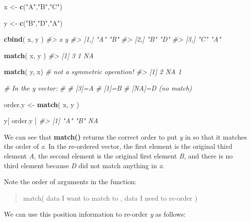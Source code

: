 \documentclass[]{book}
\newenvironment{Shaded}{\begin{snugshade}}{\end{snugshade}}
\newcommand{\CommentTok}[1]{\textcolor[rgb]{0.56,0.35,0.01}{\textit{#1}}}
\newcommand{\KeywordTok}[1]{\textcolor[rgb]{0.13,0.29,0.53}{\textbf{#1}}}
\newcommand{\NormalTok}[1]{#1}
\newcommand{\StringTok}[1]{\textcolor[rgb]{0.31,0.60,0.02}{#1}}
\theoremstyle{definition}
\theoremstyle{definition}
\theoremstyle{definition}
\theoremstyle{remark}
\begin{document}
\begin{Shaded}
\begin{Highlighting}[]

\NormalTok{x <-}\StringTok{ }\KeywordTok{c}\NormalTok{(}\StringTok{"A"}\NormalTok{,}\StringTok{"B"}\NormalTok{,}\StringTok{"C"}\NormalTok{)}

\NormalTok{y <-}\StringTok{ }\KeywordTok{c}\NormalTok{(}\StringTok{"B"}\NormalTok{,}\StringTok{"D"}\NormalTok{,}\StringTok{"A"}\NormalTok{)}

\KeywordTok{cbind}\NormalTok{( x, y )}
\CommentTok{#>      x   y  }
\CommentTok{#> [1,] "A" "B"}
\CommentTok{#> [2,] "B" "D"}
\CommentTok{#> [3,] "C" "A"}

\KeywordTok{match}\NormalTok{( x, y )}
\CommentTok{#> [1]  3  1 NA}

\KeywordTok{match}\NormalTok{( y, x) }\CommentTok{# not a symmetric operation!}
\CommentTok{#> [1]  2 NA  1}

\CommentTok{# In the y vector:}
\CommentTok{#}
\CommentTok{#  [3]=A}
\CommentTok{#  [1]=B}
\CommentTok{# [NA]=D (no match)}

\NormalTok{order.y <-}\StringTok{ }\KeywordTok{match}\NormalTok{( x, y )}

\NormalTok{y[ order.y ]}
\CommentTok{#> [1] "A" "B" NA}
\end{Highlighting}
\end{Shaded}

We can see that \textbf{match()} returns the correct order to put
\emph{y} in so that it matches the order of \emph{x}. In the re-ordered
vector, the first element is the original third element \emph{A}, the
second element is the original first element \emph{B}, and there is no
third element because \emph{D} did not match anything in \emph{x}.

Note the order of arguments in the function:

\begin{quote}
match( data I want to match to , data I need to re-order )
\end{quote}

We can use this position information to re-order \emph{y} as follows:
\end{document}
